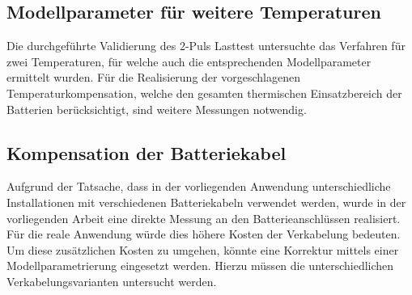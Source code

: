 \subsection{Modellparameter für weitere Temperaturen}
Die durchgeführte Validierung des 2-Puls Lasttest untersuchte
das Verfahren für zwei Temperaturen, für welche auch die
entsprechenden Modellparameter ermittelt wurden. Für die
Realisierung der vorgeschlagenen Temperaturkompensation,
welche den gesamten thermischen Einsatzbereich der
Batterien berücksichtigt, sind weitere Messungen notwendig.

\subsection{Kompensation der Batteriekabel}
Aufgrund der Tatsache, dass in der vorliegenden Anwendung
unterschiedliche Installationen mit verschiedenen Batteriekabeln
verwendet werden, wurde in der vorliegenden Arbeit eine direkte
Messung an den Batterieanschlüssen realisiert. Für die reale
Anwendung würde dies höhere Kosten der Verkabelung bedeuten.
Um diese zusätzlichen Kosten zu umgehen, könnte eine Korrektur
mittels einer Modellparametrierung eingesetzt werden. Hierzu
müssen die unterschiedlichen Verkabelungsvarianten untersucht
werden.
